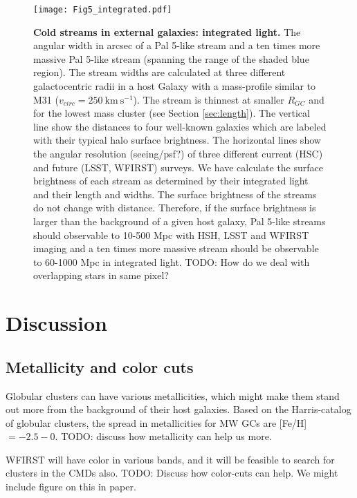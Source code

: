 \documentclass[twocolumn]{aastex62}
\newcommand{\kms}{\ensuremath{\textrm{km}~\textrm{s}^{-1}}}
\newcommand{\todo}[1]{{\color{red} TODO: #1}}
\begin{document}
\begin{figure}
\centerline{\texttt{[image: Fig5\_integrated.pdf]}}
\caption{{\bf Cold streams in external galaxies: integrated light.} The angular width in arcsec of a Pal 5-like stream and a ten times more massive Pal 5-like stream (spanning the range of the shaded blue region). The stream widths are calculated at three different galactocentric radii in a host Galaxy with a mass-profile similar to M31 ($v_{circ} = 250 ~\kms$). The stream is thinnest at smaller $R_{GC}$ and for the lowest mass cluster (see Section \ref{sec:length}). The vertical line show the distances to four well-known galaxies which are labeled with their typical halo surface brightness. The horizontal lines show the angular resolution (seeing/psf?) of three different current (HSC) and future (LSST, WFIRST) surveys. We have calculate the surface brightness of each stream as determined by their integrated light and their length and widths. The surface brightness of the streams do not change with distance. Therefore, if the surface brightness is larger than the background of a given host galaxy,  Pal 5-like streams should observable to 10-500 Mpc with HSH, LSST and WFIRST imaging and a ten times more massive stream should be observable to 60-1000 Mpc in integrated light. \todo{How do we deal with overlapping stars in same pixel?} }
\label{fig:int}
\end{figure}


\section{Discussion}
\label{sec:discussion}

\subsection{Metallicity and color cuts}
\label{sec:color}
Globular clusters can have various metallicities, which might make them stand out more from the background of their host galaxies. 
Based on the Harris-catalog of globular clusters, the spread in metallicities for MW GCs are [Fe/H]$ = -2.5 - 0$. \todo{discuss how metallicity can help us more}.

WFIRST will have color in various bands, and it will be feasible to search for clusters in the CMDs also. \todo{Discuss how color-cuts can help. We might include figure on this in paper}.
\end{document}
